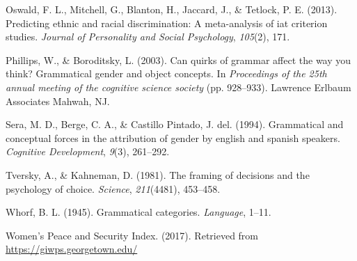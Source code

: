 \documentclass[10pt, letterpaper]{article}
\begin{document}
\hypertarget{ref-oswald2013predicting}{}
Oswald, F. L., Mitchell, G., Blanton, H., Jaccard, J., \& Tetlock, P. E.
(2013). Predicting ethnic and racial discrimination: A meta-analysis of
iat criterion studies. \emph{Journal of Personality and Social
Psychology}, \emph{105}(2), 171.

\hypertarget{ref-phillips2003can}{}
Phillips, W., \& Boroditsky, L. (2003). Can quirks of grammar affect the
way you think? Grammatical gender and object concepts. In
\emph{Proceedings of the 25th annual meeting of the cognitive science
society} (pp. 928--933). Lawrence Erlbaum Associates Mahwah, NJ.

\hypertarget{ref-sera1994grammatical}{}
Sera, M. D., Berge, C. A., \& Castillo Pintado, J. del. (1994).
Grammatical and conceptual forces in the attribution of gender by
english and spanish speakers. \emph{Cognitive Development}, \emph{9}(3),
261--292.

\hypertarget{ref-tversky1981framing}{}
Tversky, A., \& Kahneman, D. (1981). The framing of decisions and the
psychology of choice. \emph{Science}, \emph{211}(4481), 453--458.

\hypertarget{ref-whorf1945grammatical}{}
Whorf, B. L. (1945). Grammatical categories. \emph{Language}, 1--11.

\hypertarget{ref-wps}{}
Women's Peace and Security Index. (2017). Retrieved from
\url{https://giwps.georgetown.edu/}
\end{document}
